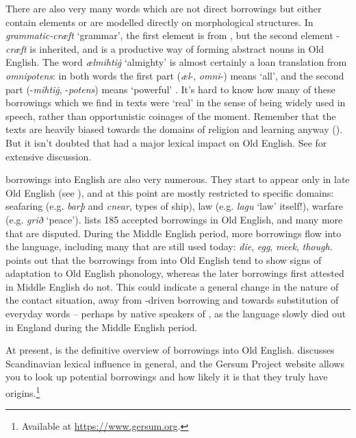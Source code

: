 There are also very many words which are not direct borrowings but either contain  elements or are modelled directly on  morphological structures. In \emph{grammatic-cræft} `grammar', the first element is from , but the second element -\emph{cræft} is inherited, and is a productive way of forming abstract nouns in Old English. The word \emph{ælmihtiġ} `almighty' is almost certainly a loan translation from  \emph{omnipotens}: in both words the first part (\emph{æl}-, \emph{omni}-) means `all', and the second part (-\emph{mihtiġ}, -\emph{potens}) means `powerful' \citep[164]{Durkin2014}. It's hard to know how many of these borrowings which we find in texts were `real' in the sense of being widely used in speech, rather than opportunistic coinages of the moment. Remember that the texts are heavily biased towards the domains of religion and learning anyway (). But it isn't doubted that  had a major lexical impact on Old English. See \citet[part III]{Durkin2014} for extensive discussion.

 borrowings into English are also very numerous. They start to appear only in late Old English (see ), and at this point are mostly restricted to specific domains: seafaring (e.g. \emph{barþ} and \emph{cnear}, types of ship), law (e.g. \emph{lagu} `law' itself!), warfare (e.g. \emph{grið} `peace'). \citet{PonsSanz2013} lists 185 accepted  borrowings in Old English, and many more that are disputed. During the Middle English period, more  borrowings flow into the language, including many that are still used today: \emph{die}, \emph{egg}, \emph{meek}, \emph{though}. \citet{Townend2002} points out that the borrowings from  into Old English tend to show signs of adaptation to Old English phonology, whereas the later borrowings first attested in Middle English do not. This could indicate a general change in the nature of the contact situation, away from -driven borrowing and towards substitution of everyday words -- perhaps by native speakers of , as the language slowly died out in England during the Middle English period.

\newpage
At present, \citet{PonsSanz2013} is the definitive overview of  borrowings into Old English. \citet[part IV]{Durkin2014} discusses Scandinavian lexical influence in general, and the Gersum Project website allows you to look up potential borrowings and how likely it is that they truly have  origins.\footnote{Available at \url{https://www.gersum.org}.}

